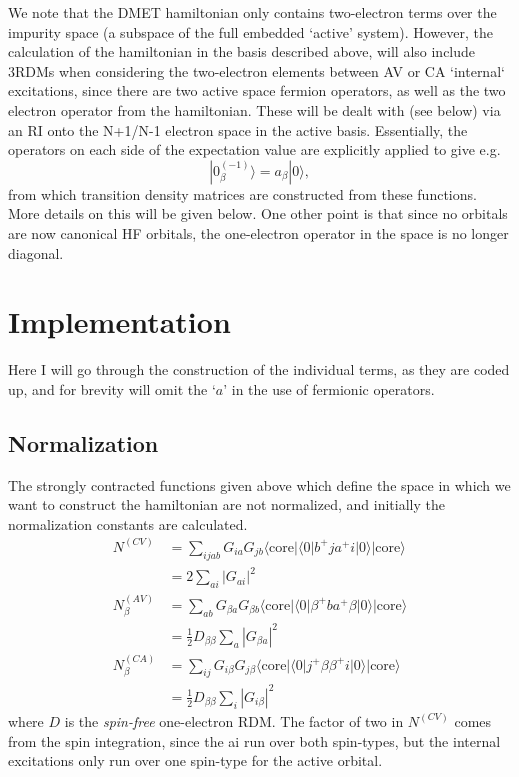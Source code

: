 \documentclass[a4paper,oneside,11pt]{article}
\numberwithin{equation}{section}
\newcommand{\DMETBra}{\langle \mathrm{core}|\langle 0|}
\newcommand{\DMETKet}{|0\rangle| \mathrm{core} \rangle}
\begin{document}
We note that the DMET hamiltonian only contains two-electron terms over the impurity space (a subspace of the full embedded `active' system). However, the calculation of the hamiltonian in the 
basis described above, will also include 3RDMs when considering the two-electron elements between AV or CA `internal` excitations, since there are two active space fermion operators, as well as the 
two electron operator from the hamiltonian. These will be dealt with (see below) via an RI onto the N+1/N-1 electron space in the active basis. Essentially, the operators on each side of the
expectation value are explicitly applied to give e.g.
\begin{equation}
|0^{(-1)}_{\beta} \rangle = a_{\beta} |0\rangle ,
\end{equation}
from which transition density matrices are constructed from these functions. More details on this will be given below. One other point is that since no orbitals are now canonical HF orbitals,
the one-electron operator in the space is no longer diagonal.

\section{Implementation}
Here I will go through the construction of the individual terms, as they are coded up, and for brevity will omit the `$a$' in the use of fermionic operators.
\subsection{Normalization}
The strongly contracted functions given above which define the space in which we want to construct the hamiltonian are not normalized, and initially the normalization constants are calculated.
\begin{eqnarray}
N^{(CV)} &= \sum_{ijab} G_{ia} G_{jb} \DMETBra b^{+} j a^{+} i \DMETKet \\
&= 2\sum_{ai} |G_{ai}|^2    \\
N^{(AV)}_{\beta} &= \sum_{ab} G_{\beta a} G_{\beta b} \DMETBra \beta^{+} b a^{+} \beta \DMETKet \\
&= \frac{1}{2} D_{\beta \beta} \sum_{a} |G_{\beta a}|^2    \\
N^{(CA)}_{\beta} &= \sum_{ij} G_{i \beta} G_{j \beta} \DMETBra j^{+} \beta \beta^{+} i \DMETKet \\
&= \frac{1}{2} D_{\beta \beta} \sum_{i} |G_{i \beta}|^2
\end{eqnarray}
where $D$ is the {\em spin-free} one-electron RDM. The factor of two in $N^{(CV)}$ comes from the spin integration, since the ai run over both spin-types, but the internal excitations only
run over one spin-type for the active orbital.
\end{document}
